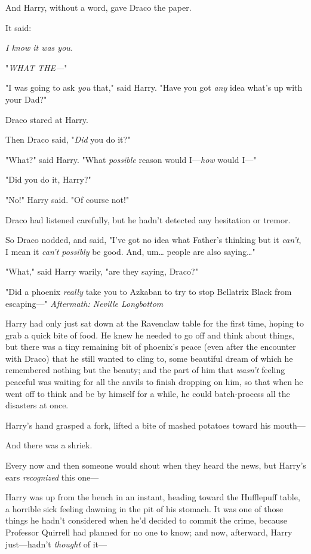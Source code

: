 And Harry, without a word, gave Draco the paper.

It said:

\emph{I know it was you.}

"\emph{WHAT THE---}"

"I was going to ask \emph{you} that," said Harry. "Have you got \emph{any} idea 
what's up with your Dad?"

Draco stared at Harry.

Then Draco said, "\emph{Did} you do it?"

"What?" said Harry. "What \emph{possible} reason would I---\emph{how} would 
I---"

"Did you do it, Harry?"

"No!" Harry said. "Of course not!"

Draco had listened carefully, but he hadn't detected any hesitation or tremor.

So Draco nodded, and said, "I've got no idea what Father's thinking but it 
\emph{can't}, I mean it \emph{can't possibly} be good. And, um{\ldots} people 
are also saying{\ldots}"

"What," said Harry warily, "are they saying, Draco?"

"Did a phoenix \emph{really} take you to Azkaban to try to stop Bellatrix Black 
from escaping---"
\sbreak
\emph{Aftermath: Neville Longbottom}

Harry had only just sat down at the Ravenclaw table for the first time, hoping 
to grab a quick bite of food. He knew he needed to go off and think about 
things, but there was a tiny remaining bit of phoenix's peace (even after the 
encounter with Draco) that he still wanted to cling to, some beautiful dream of 
which he remembered nothing but the beauty; and the part of him that 
\emph{wasn't} feeling peaceful was waiting for all the anvils to finish 
dropping on him, so that when he went off to think and be by himself for a 
while, he could batch-process all the disasters at once.

Harry's hand grasped a fork, lifted a bite of mashed potatoes toward his 
mouth---

And there was a shriek.

Every now and then someone would shout when they heard the news, but Harry's 
ears \emph{recognized} this one---

Harry was up from the bench in an instant, heading toward the Hufflepuff table, 
a horrible sick feeling dawning in the pit of his stomach. It was one of those 
things he hadn't considered when he'd decided to commit the crime, because 
Professor Quirrell had planned for no one to know; and now, afterward, Harry 
just---hadn't \emph{thought} of it---

